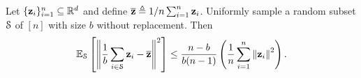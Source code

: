 \documentclass[10pt,twocolumn,journal]{IEEEtran}
\begin{document}
\iffalse
\begin{lemma}[Borel-Cantelli; \cite{Will_91}]\label{lem:borel_cantelli}
Consider a probability space $(\Omega',\Sigma',\overline{\bbP})$. 
Let $\{\calA_n\}_{n\ge 0}$ be a sequence of sets in $\Sigma'$. If $\sum_{n=0}^\infty\overline{\bbP}(\calA_n)<\infty$, then $\overline{\bbP}(\limsup_{n\to\infty}\calA_n)=0$. 
\end{lemma}\fi

\begin{lemma}\label{lem:uniform_samp_worep} 
Let $\{\mathbf{z}_i\}_{i=1}^n\subseteq\mathbb{R}^d$ and define $\overline{\bf z}\triangleq 1/n\sum_{i=1}^n\mathbf{z}_i$. Uniformly sample a random subset $\mathcal{S}$ of $[n]$ with size $b$ without replacement. Then 
\begin{equation}
\mathbb{E}_{\mathcal{S}} \left[\left\Vert\frac{1}{b}\sum_{i\in\mathcal{S}}\mathbf{z}_i - \overline{\bf z}\right\Vert^2\right] \le \frac{n-b}{b(n-1)}\left(\frac{1}{n}\sum_{i=1}^n\left\Vert\mathbf{z}_i\right\Vert^2\right). 
\end{equation}
\end{lemma}




\end{document}
